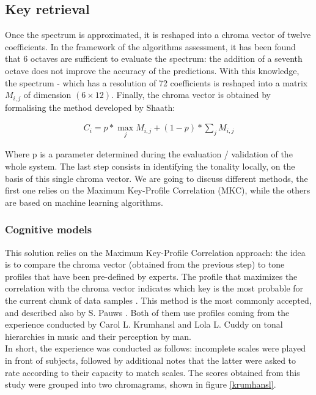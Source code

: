 \documentclass[letterpaper]{article}
\begin{document}
\subsection{Key retrieval}

Once the spectrum is approximated, it is reshaped into a chroma vector of twelve coefficients. In the framework of the algorithms assessment, it has been found that 6 octaves are sufficient to evaluate the spectrum: the addition of a seventh octave does not improve the accuracy of the predictions. With this knowledge, the spectrum - which has a resolution of 72 coefficients is reshaped into a matrix $M_{i, j}$ of dimension $(6 \times 12)$. Finally, the chroma vector is obtained by formalising the method developed by Sha\textquotesingle ath:

\begin{align}
C_{i} = p * \max_{j} M_{i, j} + (1 - p) * \sum_{j} M_{i, j}
\label{chroma}
\end{align}

Where p is a parameter determined during the evaluation / validation of the whole system.
The last step consists in identifying the tonality locally,
on the basis of this single chroma vector. We are going to discuss different methods, the first one relies on the Maximum Key-Profile Correlation (MKC),
while the others are based on machine learning algorithms.

\subsubsection{Cognitive models}

This solution relies on the Maximum Key-Profile Correlation approach: the idea is to compare the chroma vector (obtained from the previous step) to
tone profiles that have been pre-defined by experts. The profile that maximizes the correlation with the chroma vector indicates which key is the most probable
for the current chunk of data samples \citep{AT}. This method is the most commonly accepted, and described also by S. Pauws \citep{SP}. Both of them use profiles coming from the experience conducted by Carol L. Krumhansl and Lola L. Cuddy on tonal hierarchies in music and their perception by man.\\

In short, the experience was conducted as follows: incomplete scales were played in front of subjects, followed by additional notes that the latter were asked to rate according to their capacity to match scales. The scores obtained from this study were grouped into two chromagrams, shown in figure \ref{krumhansl}. \\
\end{document}
